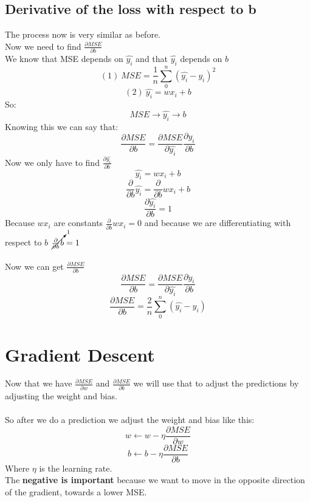 \documentclass[12pt,a4paper]{article}
\begin{document}
			\subsection{Derivative of the loss with respect to b}
				The process now is very similar as before.\\
				Now we need to find $\frac{\partial MSE}{\partial b}$\\
				We know that MSE depends on $\hat{y_i}$ and that $\hat{y_i}$ depends on $b$
				$$(1)\	MSE=\frac{1}{n}\sum_{0}^{n} (\hat{y_i}-y_i)^2$$
				$$(2)\	\hat{y_i}=wx_i+b$$
				So:
				$$MSE \longrightarrow \hat{y_i} \longrightarrow b$$
				Knowing this we can say that:
				$$\frac{\partial MSE}{\partial b} = \frac{\partial MSE}{\partial \hat{y_i}}\frac{\partial \hat{y_i}}{\partial b}$$
				Now we only have to find $\frac{\partial \hat{y_i}}{\partial b}$
				$$\hat{y_i} = wx_i+b$$
				$$\frac{\partial}{\partial b}\hat{y_i} = \frac{\partial}{\partial b}wx_i+b$$
				$$\boxed{\frac{\partial \hat{y_i}}{\partial b} = 1}$$
				Because $wx_i$ are constants $\frac{\partial }{\partial b} wx_i = 0$ and because we are differentiating with respect to $b$ $\cancelto{1}{\frac{\partial }{\partial b} b} = 1$\\
				\\
				Now we can get $\frac{\partial MSE}{\partial b}$
				$$\frac{\partial MSE}{\partial b} = \frac{\partial MSE}{\partial \hat{y_i}}\frac{\partial \hat{y_i}}{\partial b}$$
				$$\boxed{\frac{\partial MSE}{\partial b} = \frac{2}{n}\sum_{0}^{n}(\hat{y_i}-y_i)}$$
		\section{Gradient Descent}
			Now that we have $\frac{\partial MSE}{\partial w}$ and $\frac{\partial MSE}{\partial b}$ we will use that to adjust the predictions by adjusting the weight and bias.\\
			\\
			So after we do a prediction we adjust the weight and bias like this:
			$$w \leftarrow w - \eta \frac{\partial MSE}{\partial w}$$
			$$b \leftarrow b - \eta \frac{\partial MSE}{\partial b}$$
			Where $\eta$ is the learning rate.\\
			The \textbf{negative is important} because we want to move in the opposite direction of the gradient, towards a lower MSE.
				
				
				
\end{document}
